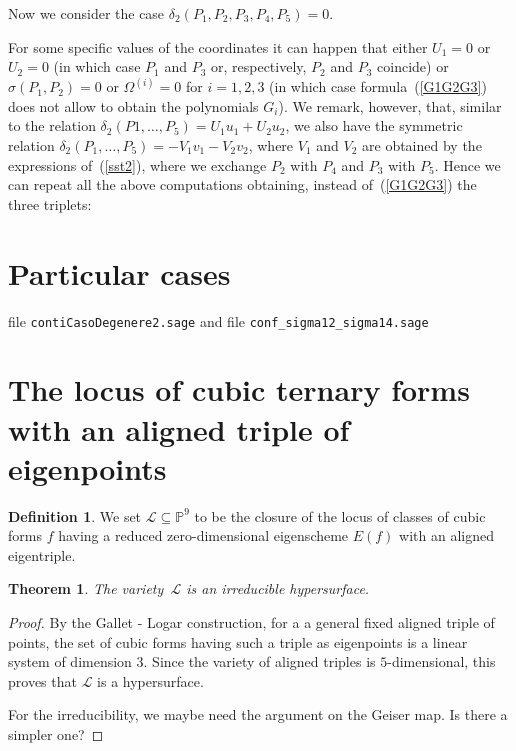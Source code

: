 \documentclass[11pt, a4paper, reqno, captions=tableheading,bibliography=totoc]{scrartcl}
\theoremstyle{plain}
\newtheorem{theorem}[lemma]{Theorem}
\theoremstyle{definition}
\newtheorem{definition}[lemma]{Definition}
\newcommand{\p}{\mathbb{P}}
\begin{document}
Now we consider the case $\delta_2(P_1, P_2, P_3, P_4, P_5) = 0$.

For some specific values of the coordinates it can happen that either
$U_1=0$ or $U_2=0$ (in which case $P_1$ and $P_3$ or, respectively, $P_2$
and $P_3$ coincide) or $\sigma(P_1, P_2) = 0$ or $\Omega^{(i)} = 0$ for
$i = 1, 2, 3$ (in which case formula~(\ref{G1G2G3}) does not allow to
obtain the polynomials $G_i$). We remark, however, that, similar to the
relation $\delta_2(P1, \dots, P_5) = U_1u_1+U_2u_2$, we also have the
symmetric relation $\delta_2(P_1, \dots, P_5) = -V_1v_1-V_2v_2$, where
$V_1$ and $V_2$ are obtained by the expressions of~(\ref{sst2}), where
we exchange $P_2$ with $P_4$ and $P_3$ with $P_5$. Hence we can repeat
all the above computations obtaining, instead of~(\ref{G1G2G3}) the
three triplets:

\section{Particular cases}
file \verb+contiCasoDegenere2.sage+ and file
\verb+conf_sigma12_sigma14.sage+

\section{The locus of cubic ternary forms with an aligned triple of eigenpoints}
\label{locus_one_alignment}

\begin{definition}
 We set $\mathcal{L} \subseteq \p^9$ to be the closure of the locus of classes of cubic forms $f$ having a reduced zero-dimensional eigenscheme $E(f)$ with an aligned eigentriple.
\end{definition}

\begin{theorem}
The variety~$\mathcal{L}$ is an irreducible hypersurface.
\end{theorem}

\begin{proof}
By the Gallet - Logar construction, for a a general fixed aligned triple of points, the set of cubic forms having such a triple as eigenpoints is a linear system of dimension 3. Since the variety of aligned triples is $5$-dimensional, this proves that $\mathcal{L}$ is a hypersurface.

For the irreducibility, we maybe need the argument on the Geiser map. Is there a simpler one?
\end{proof}
\end{document}

